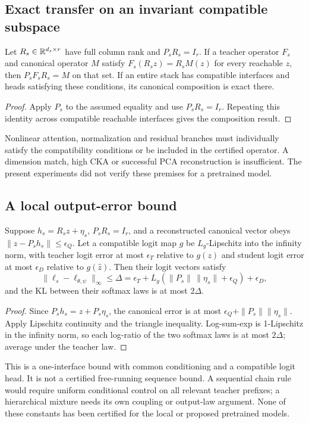 \documentclass[11pt,a4paper]{article}
\begin{document}
\subsection{Exact transfer on an invariant compatible subspace}
\begin{proposition}
Let \(R_s\in\mathbb{R}^{d_s\times r}\) have full column rank and
\(P_sR_s=I_r\). If a teacher operator \(F_s\) and canonical operator \(M\)
satisfy \(F_s(R_sz)=R_sM(z)\) for every reachable \(z\), then
\(P_sF_sR_s=M\) on that set. If an entire stack has compatible interfaces and
heads satisfying these conditions, its canonical composition is exact there.
\end{proposition}
\begin{proof}
Apply \(P_s\) to the assumed equality and use \(P_sR_s=I_r\). Repeating this
identity across compatible reachable interfaces gives the composition result.
\end{proof}
Nonlinear attention, normalization and residual branches must individually
satisfy the compatibility conditions or be included in the certified operator.
A dimension match, high CKA or successful PCA reconstruction is insufficient.
The present experiments did not verify these premises for a pretrained model.

\subsection{A local output-error bound}
\begin{proposition}
Suppose \(h_s=R_sz+\eta_s\), \(P_sR_s=I_r\), and a reconstructed canonical
vector obeys \(\|\widehat z-P_sh_s\|\leq\epsilon_Q\). Let a compatible logit
map \(g\) be \(L_g\)-Lipschitz into the infinity norm, with teacher logit error
at most \(\epsilon_T\) relative to \(g(z)\) and student logit error at most
\(\epsilon_D\) relative to \(g(\widehat z)\). Then their logit vectors satisfy
\begin{equation}
 \|\ell_s-\ell_{\theta,\psi}\|_\infty\leq
 \Delta=\epsilon_T+L_g(\|P_s\|\,\|\eta_s\|+\epsilon_Q)+\epsilon_D,
\end{equation}
and the KL between their softmax laws is at most \(2\Delta\).
\end{proposition}
\begin{proof}
Since \(P_sh_s=z+P_s\eta_s\), the canonical error is at most
\(\epsilon_Q+\|P_s\|\|\eta_s\|\). Apply Lipschitz continuity and the triangle
inequality. Log-sum-exp is 1-Lipschitz in the infinity norm, so each log-ratio of
the two softmax laws is at most \(2\Delta\); average under the teacher law.
\end{proof}
This is a one-interface bound with common conditioning and a compatible logit
head. It is not a certified free-running sequence bound. A sequential chain
rule would require uniform conditional control on all relevant teacher prefixes;
a hierarchical mixture needs its own coupling or output-law argument. None of
these constants has been certified for the local or proposed pretrained models.
\end{document}
